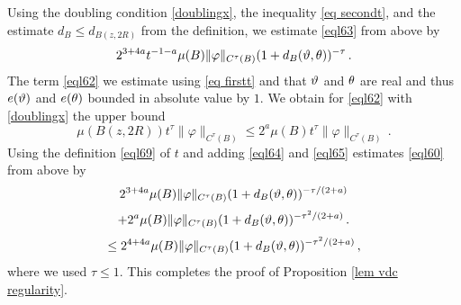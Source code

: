 Using   the doubling condition \eqref{doublingx},
the inequality \eqref{eq secondt}, and the estimate
$d_B\le d_{B(z,2R)}$ from the definition,
we estimate \eqref{eql63} from above by
\begin{equation}\label{eql64}
        2^{3+4a}t^{-1-a} \mu(B) \|{\varphi}\|_{C^\tau(B)}
        (1 + d_{B}(\vartheta,\theta))^{-\tau}  \, .
    \end{equation}
The term \eqref{eql62} we estimate using
\eqref{eq firstt} and that
$\vartheta$ and $\theta$ are real and thus $e(\vartheta)$ and
$e(\theta)$ bounded in absolute value by $1$.
We obtain for \eqref{eql62} with \eqref{doublingx}
the upper bound
    \begin{equation}\label{eql65}
        \mu(B(z,2R)) t^{\tau} \|\varphi\|_{C^\tau(B)}
        \le  2^a \mu(B) t^{\tau} \|\varphi\|_{C^\tau(B)}
        \,.
    \end{equation}
Using the definition \eqref{eql69} of $t$ and adding
\eqref{eql64} and \eqref{eql65} estimates
\eqref{eql60} from above by
\begin{equation}
        2^{3+4a} \mu(B) \|{\varphi}\|_{C^\tau(B)}
        (1 + d_{B}(\vartheta,\theta))^{-\tau/(2+a)}
        \end{equation}
\begin{equation} +
        2^a \mu(B) \|{\varphi}\|_{C^\tau(B)}
        (1 + d_{B}(\vartheta,\theta))^{-\tau^2/(2+a)}\, .
    \end{equation}
\begin{equation}\label{eql66}
        \le  2^{4+4a} \mu(B) \|{\varphi}\|_{C^\tau(B)}
        (1 + d_{B}(\vartheta,\theta))^{-\tau^2/(2+a)}  \, ,
    \end{equation}
where we used $\tau\le 1$. 
This completes the proof of Proposition \ref{lem vdc regularity}.

